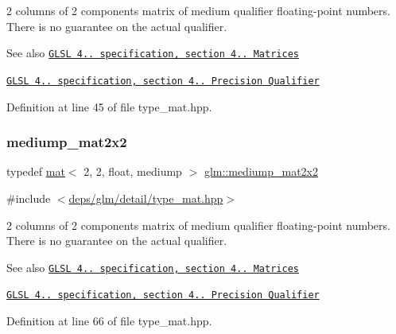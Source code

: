 2 columns of 2 components matrix of medium qualifier floating-\/point numbers. There is no guarantee on the actual qualifier.

\begin{DoxySeeAlso}{See also}
\href{http://www.opengl.org/registry/doc/GLSLangSpec.4.20.8.pdf}{\tt G\+L\+SL 4.. specification, section 4.. Matrices} 

\href{http://www.opengl.org/registry/doc/GLSLangSpec.4.20.8.pdf}{\tt G\+L\+SL 4.. specification, section 4.. Precision Qualifier} 
\end{DoxySeeAlso}


Definition at line 45 of file type\+\_\+mat.\+hpp.

\mbox{\label{group__core__precision_gaa7581ec892b01e6ba19c4fdbc7c60df4}} 
\subsubsection{\texorpdfstring{mediump\+\_\+mat2x2}{mediump\_mat2x2}}
{\footnotesize\ttfamily typedef \hyperlink{structglm_1_1mat}{mat}$<$ 2, 2, float, mediump $>$ \hyperlink{group__core__precision_gaa7581ec892b01e6ba19c4fdbc7c60df4}{glm\+::mediump\+\_\+mat2x2}}



{\ttfamily \#include $<$\hyperlink{type__mat_8hpp}{deps/glm/detail/type\+\_\+mat.\+hpp}$>$}

2 columns of 2 components matrix of medium qualifier floating-\/point numbers. There is no guarantee on the actual qualifier.

\begin{DoxySeeAlso}{See also}
\href{http://www.opengl.org/registry/doc/GLSLangSpec.4.20.8.pdf}{\tt G\+L\+SL 4.. specification, section 4.. Matrices} 

\href{http://www.opengl.org/registry/doc/GLSLangSpec.4.20.8.pdf}{\tt G\+L\+SL 4.. specification, section 4.. Precision Qualifier} 
\end{DoxySeeAlso}


Definition at line 66 of file type\+\_\+mat.\+hpp.

\mbox{\label{group__core__precision_gae5003c3cea9aa152bf452223b7fd0fd5}} 
